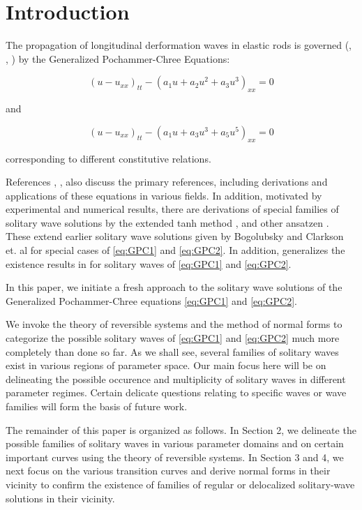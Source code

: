 \section{Introduction}

The propagation of longitudinal derformation waves in elastic rods is governed (\cite{LCZ}, \cite{Runz}, \cite{WM})
by the Generalized Pochammer-Chree Equations:

\begin{equation}\label{eq:GPC1}
\left( u - u_{xx} \right)_{tt} - \left( a_1 u + a_2 u^2 + a_3 u^3 \right)_{xx} =0  
\end{equation}

and

\begin{equation}  \label{eq:GPC2} 
\left( u - u_{xx} \right)_{tt} - \left( a_1 u + a_3 u^3 + a_5 u^5 \right)_{xx} =0
\end{equation}

corresponding to different constitutive relations.

References \cite{LCZ}, \cite{Runz}, \cite{WM} also discuss the primary references, including derivations and
applications of these equations in various fields. In addition, motivated by experimental and numerical results, there
are derivations of special families of solitary wave solutions by the extended tanh method \cite{LCZ}, and other
ansatzen \cite{WM}. These extend earlier solitary wave solutions given by Bogolubsky \cite{Bogo} and Clarkson et. al \cite{CLVS} for
special cases of \eqref{eq:GPC1} and \eqref{eq:GPC2}. In addition, \cite{Runz} generalizes the existence results in \cite{Sax} for
solitary waves of \eqref{eq:GPC1} and \eqref{eq:GPC2}.  

In this paper, we initiate a fresh approach to the solitary wave solutions of the Generalized Pochammer-Chree equations \eqref{eq:GPC1} and \eqref{eq:GPC2}. 

We invoke the theory of reversible systems and the method of normal forms to categorize the possible solitary waves of \eqref{eq:GPC1} 
and \eqref{eq:GPC2} much more completely than done so far.  
As we shall see, several families of solitary waves exist in various regions of parameter space. Our main focus here will be on 
delineating the possible occurence and multiplicity of solitary waves in different parameter regimes. Certain delicate questions
relating to specific waves or wave families will form the basis of future work. 

The remainder of this paper is organized as follows. In Section 2, we delineate the possible families of solitary waves
in various parameter domains and on certain important curves using the theory of reversible systems. In Section 3 and 4, we next
focus on the various transition curves and derive normal forms in their vicinity to confirm the existence of families of 
regular or delocalized solitary-wave solutions in their vicinity.
